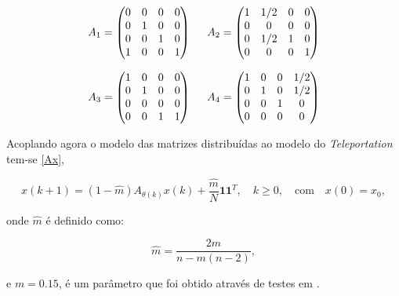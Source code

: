 \documentclass[a4paper]{report} %
\begin{document}
\begin{equation}\label{A12}
A_1 = \begin{pmatrix}
 0 &  0  & 0 &  0 \\
 0 &  1  & 0 &  0 \\
 0 &  0  & 1 &  0  \\
 1 &  0  & 0 &  1
\end{pmatrix}
%
\hspace{0.5cm}
%
A_2 = \begin{pmatrix}
 1 & 1/2 & 0 &  0 \\
 0 &  0  & 0 &  0 \\
 0 & 1/2 & 1 &  0  \\
 0 &  0  & 0 &  1
\end{pmatrix}
\end{equation}

\vspace{0.1cm}

\begin{equation}\label{A34}
A_3 = \begin{pmatrix}
 1 &  0  & 0 &  0 \\
 0 &  1  & 0 &  0 \\
 0 &  0  & 0 &  0  \\
 0 &  0  & 1 &  1
\end{pmatrix}
%
\hspace{0.5cm}
%
A_4 = \begin{pmatrix}
 1 &  0  & 0 & 1/2 \\
 0 &  1  & 0 & 1/2 \\
 0 &  0  & 1 &  0  \\
 0 &  0  & 0 &  0
\end{pmatrix}
\end{equation}	

Acoplando agora o modelo das matrizes distribuídas ao modelo do \textit{Teleportation} tem-se \eqref{Ax},

\begin{equation} \label{Ax}
x(k+1) = (1 - \hat{m})A_{\theta(k)}x(k) + \frac{\hat{m}}{N} \textbf{11}^T, \quad k \geq 0, \quad \text{com} \quad x(0) = x_0,
\end{equation}

\noindent onde $\hat{m}$ é definido como: 

\begin{equation}\label{m}
\hat{m} = \frac{2m}{n-m(n-2)},
\end{equation}

\noindent e $m = 0.15$, é um parâmetro que foi obtido através de testes em \cite{zaki2012detection}.    
\end{document}
